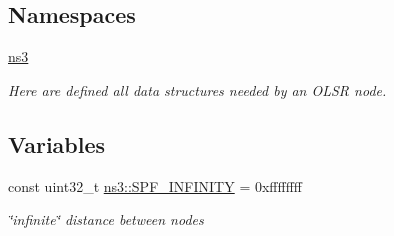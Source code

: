 \subsection*{Namespaces}
\begin{DoxyCompactItemize}
\item 
 \hyperlink{namespacens3}{ns3}
\begin{DoxyCompactList}\small\item\em Here are defined all data structures needed by an O\+L\+SR node. \end{DoxyCompactList}\end{DoxyCompactItemize}
\subsection*{Variables}
\begin{DoxyCompactItemize}
\item 
const uint32\+\_\+t \hyperlink{namespacens3_a769ef05d7ddcbbcb31343fa01a4d270b}{ns3\+::\+S\+P\+F\+\_\+\+I\+N\+F\+I\+N\+I\+TY} = 0xffffffff
\begin{DoxyCompactList}\small\item\em \char`\"{}infinite\char`\"{} distance between nodes \end{DoxyCompactList}\end{DoxyCompactItemize}
